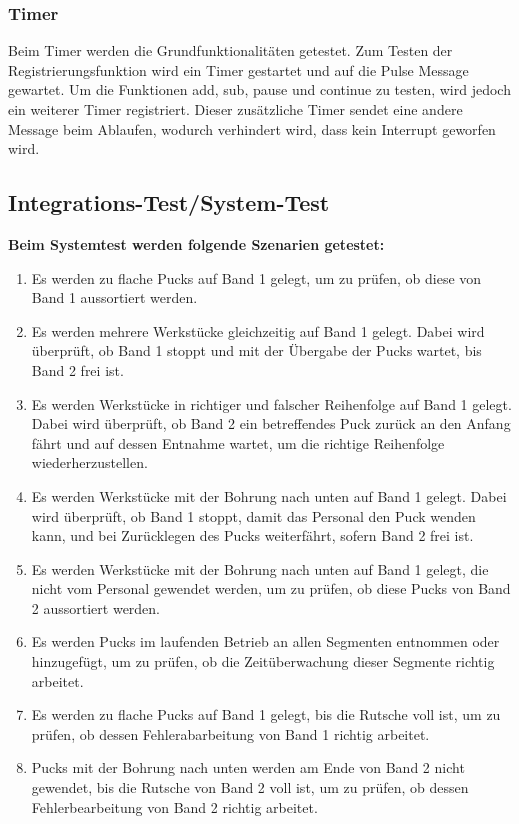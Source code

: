 \documentclass[oneside,a4paper,titlepage]{scrartcl}              %
\begin{document}
\subsubsection{Timer}
Beim Timer werden die Grundfunktionalitäten getestet.\newline
Zum Testen der Registrierungsfunktion wird ein Timer gestartet und auf die Pulse Message gewartet.\newline
Um die Funktionen add, sub, pause und continue zu testen, wird jedoch ein weiterer Timer registriert.
Dieser zusätzliche Timer sendet eine andere Message beim Ablaufen, wodurch verhindert wird, dass kein Interrupt
geworfen wird.

\newpage

\subsection{Integrations-Test/System-Test}
\textbf{Beim Systemtest werden folgende Szenarien getestet:}\newline
\begin{enumerate}
  \item Es werden zu flache Pucks auf Band 1 gelegt, um zu prüfen, ob diese von Band 1 aussortiert werden.
  \item Es werden mehrere Werkstücke gleichzeitig auf Band 1 gelegt. Dabei wird überprüft, ob Band 1 stoppt und mit der Übergabe der Pucks wartet, bis Band 2 frei ist.
  \item Es werden Werkstücke in richtiger und falscher Reihenfolge auf Band 1 gelegt. Dabei wird überprüft, ob Band 2 ein betreffendes Puck zurück an den Anfang fährt und auf dessen Entnahme wartet, um die richtige Reihenfolge wiederherzustellen.
  \item Es werden Werkstücke mit der Bohrung nach unten auf Band 1 gelegt. Dabei wird überprüft, ob Band 1 stoppt, damit das Personal den Puck wenden kann, und bei Zurücklegen des Pucks weiterfährt, sofern Band 2 frei ist.
  \item Es werden Werkstücke mit der Bohrung nach unten auf Band 1 gelegt, die nicht vom Personal gewendet werden, um zu prüfen, ob diese Pucks von Band 2 aussortiert werden.
  \item Es werden Pucks im laufenden Betrieb an allen Segmenten entnommen oder hinzugefügt, um zu prüfen, ob die Zeitüberwachung dieser Segmente richtig arbeitet.
  \item Es werden zu flache Pucks auf Band 1 gelegt, bis die Rutsche voll ist, um zu prüfen, ob dessen Fehlerabarbeitung von Band 1 richtig arbeitet.
  \item Pucks mit der Bohrung nach unten werden am Ende von Band 2 nicht gewendet, bis die Rutsche von Band 2 voll ist, um zu prüfen, ob dessen Fehlerbearbeitung von Band 2 richtig arbeitet.
\end{enumerate}
\end{document}
